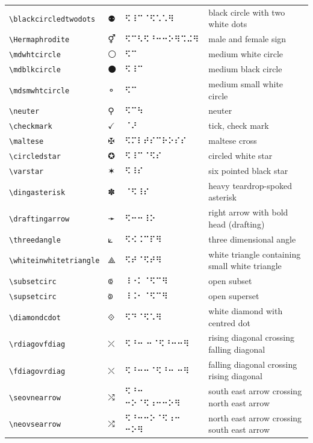 \documentclass[oneside]{article}
\begin{document}
\begin{longtable}{llll}
\verb|\blackcircledtwodots| & $\blackcircledtwodots$ &  ⠫⠸⠉⠈⠫⠡⠡⠻  & {black circle with two white dots} \\[2ex]
\verb|\Hermaphrodite| & $\Hermaphrodite$ &  ⠫⠉⠣⠫⠘⠒⠒⠕⠻⠩⠬⠻  & {male and female sign} \\[2ex]
\verb|\mdwhtcircle| & $\mdwhtcircle$ &  ⠫⠉  & {medium white circle} \\[2ex]
\verb|\mdblkcircle| & $\mdblkcircle$ &  ⠫⠸⠉  & {medium black circle} \\[2ex]
\verb|\mdsmwhtcircle| & $\mdsmwhtcircle$ &  ⠫⠉  & {medium small white circle} \\[2ex]
\verb|\neuter| & $\neuter$ &  ⠫⠉⠳  & {neuter} \\[2ex]
\verb|\checkmark| & $\checkmark$ &  ⠈⠜  & {tick, check mark} \\[2ex]
\verb|\maltese| & $\maltese$ &  ⠫⠍⠇⠞⠎⠉⠗⠕⠎⠎  & {maltese cross} \\[2ex]
\verb|\circledstar| & $\circledstar$ &  ⠫⠸⠉⠈⠫⠎  & {circled white star} \\[2ex]
\verb|\varstar| & $\varstar$ &  ⠫⠸⠎  & {six pointed black star} \\[2ex]
\verb|\dingasterisk| & $\dingasterisk$ &  ⠈⠫⠸⠎  & {heavy teardrop-spoked asterisk} \\[2ex]
\verb|\draftingarrow| & $\draftingarrow$ &   ⠫⠒⠒⠸⠕    & {right arrow with bold head (drafting)} \\[2ex]
\verb|\threedangle| & $\threedangle$ &  ⠫⠪⠨⠉⠏⠻  & {three dimensional angle} \\[2ex]
\verb|\whiteinwhitetriangle| & $\whiteinwhitetriangle$ &  ⠫⠞⠈⠫⠞⠻  & {white triangle containing small white triangle} \\[2ex]
\verb|\subsetcirc| & $\subsetcirc$ &  ⠸⠐⠅⠈⠫⠉⠻  & {open subset} \\[2ex]
\verb|\supsetcirc| & $\supsetcirc$ &  ⠸⠨⠂⠈⠫⠉⠻  & {open superset} \\[2ex]
\verb|\diamondcdot| & $\diamondcdot$ &  ⠫⠙⠈⠫⠡⠻  & {white diamond with centred dot} \\[2ex]
\verb|\rdiagovfdiag| & $\rdiagovfdiag$ &  ⠫⠘⠒ ⠒⠈⠫⠘⠒⠒⠻  & {rising diagonal crossing falling diagonal} \\[2ex]
\verb|\fdiagovrdiag| & $\fdiagovrdiag$ &  ⠫⠘⠒⠒⠈⠫⠘⠒ ⠒⠻  & {falling diagonal crossing rising diagonal} \\[2ex]
\verb|\seovnearrow| & $\seovnearrow$ &   ⠫⠘⠒ ⠒⠕⠈⠫⠰⠒⠒⠕⠻   & {south east arrow crossing north east arrow} \\[2ex]
\verb|\neovsearrow| & $\neovsearrow$ &   ⠫⠘⠒⠒⠕⠈⠫⠰⠒ ⠒⠕⠻   & {north east arrow crossing south east arrow} \\[2ex]

\end{longtable}
\end{document}
